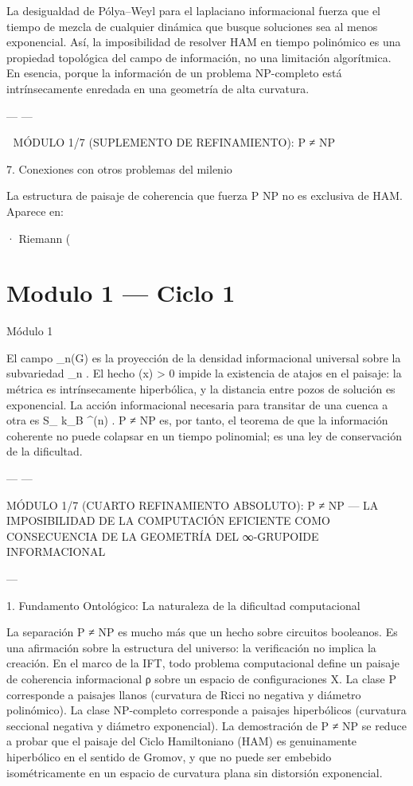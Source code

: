 \documentclass[12pt,twoside]{book}
\begin{document}
La desigualdad de Pólya–Weyl para el laplaciano informacional fuerza que el tiempo de mezcla de cualquier dinámica que busque soluciones sea al menos exponencial. Así, la imposibilidad de resolver HAM en tiempo polinómico es una propiedad topológica del campo de información, no una limitación algorítmica. En esencia,  porque la información de un problema NP-completo está intrínsecamente enredada en una geometría de alta curvatura.

---
---

🧬 MÓDULO 1/7 (SUPLEMENTO DE REFINAMIENTO): P ≠ NP

7. Conexiones con otros problemas del milenio

La estructura de paisaje de coherencia que fuerza P \neq NP no es exclusiva de HAM. Aparece en:

· Riemann (

\chapter{Modulo 1 — Ciclo 1}
Módulo 1

El campo  \rho_n(G)  es la proyección de la densidad informacional universal sobre la subvariedad  _n . El hecho  \rho(x) > 0  impide la existencia de atajos en el paisaje: la métrica es intrínsecamente hiperbólica, y la distancia entre pozos de solución es exponencial. La acción informacional necesaria para transitar de una cuenca a otra es  S_{} \ge k_B  ^{\Omega(n)} . P ≠ NP es, por tanto, el teorema de que la información coherente no puede colapsar en un tiempo polinomial; es una ley de conservación de la dificultad.

---
---

MÓDULO 1/7 (CUARTO REFINAMIENTO ABSOLUTO): P ≠ NP — LA IMPOSIBILIDAD DE LA COMPUTACIÓN EFICIENTE COMO CONSECUENCIA DE LA GEOMETRÍA DEL ∞-GRUPOIDE INFORMACIONAL

---

1. Fundamento Ontológico: La naturaleza de la dificultad computacional

La separación P ≠ NP es mucho más que un hecho sobre circuitos booleanos. Es una afirmación sobre la estructura del universo: la verificación no implica la creación. En el marco de la IFT, todo problema computacional define un paisaje de coherencia informacional ρ sobre un espacio de configuraciones X. La clase P corresponde a paisajes llanos (curvatura de Ricci no negativa y diámetro polinómico). La clase NP-completo corresponde a paisajes hiperbólicos (curvatura seccional negativa y diámetro exponencial). La demostración de P ≠ NP se reduce a probar que el paisaje del Ciclo Hamiltoniano (HAM) es genuinamente hiperbólico en el sentido de Gromov, y que no puede ser embebido isométricamente en un espacio de curvatura plana sin distorsión exponencial.
\end{document}
